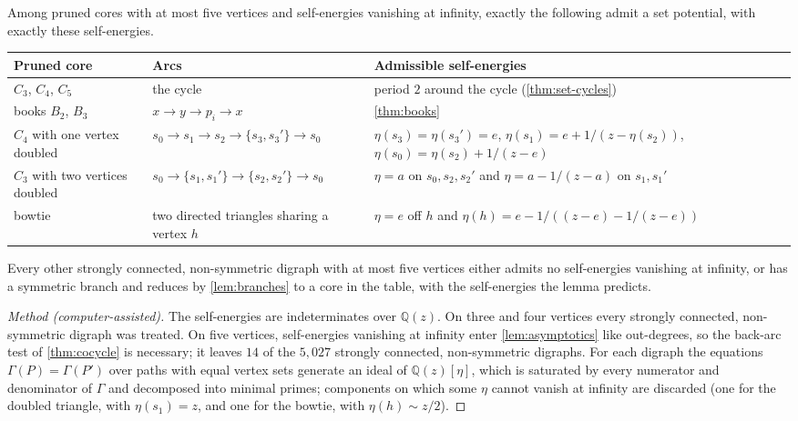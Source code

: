 \documentclass[final]{siamart0516}
\numberwithin{theorem}{section}
\numberwithin{equation}{section}
\theoremstyle{siamnonum}
\theoremstyle{plain}
\newcommand{\QQ}{\mathbb{Q}}
\newcommand{\Qz}{\QQ(z)}
\begin{document}
\begin{theorem}\label{thm:cores5}
Among pruned cores with at most five vertices and self-energies vanishing at infinity, exactly the following admit a set potential, with exactly these self-energies.
\begin{center}\small
\begin{tabularx}{\linewidth}{@{}L{0.2}L{0.3}>{\raggedright\arraybackslash}X@{}}
\toprule
Pruned core & Arcs & Admissible self-energies\\ \midrule
$C_3$, $C_4$, $C_5$ & the cycle & period $2$ around the cycle (\cref{thm:set-cycles})\\
books $B_2$, $B_3$ & $x\to y\to p_i\to x$ & \cref{thm:books}\\
$C_4$ with one vertex doubled & $s_0\to s_1\to s_2\to\{s_3,s_3'\}\to s_0$ & $\eta(s_3)=\eta(s_3')=e$, $\eta(s_1)=e+1/(z-\eta(s_2))$, $\eta(s_0)=\eta(s_2)+1/(z-e)$\\
$C_3$ with two vertices doubled & $s_0\to\{s_1,s_1'\}\to\{s_2,s_2'\}\to s_0$ & $\eta=a$ on $s_0,s_2,s_2'$ and $\eta=a-1/(z-a)$ on $s_1,s_1'$\\
bowtie & two directed triangles sharing a vertex $h$ & $\eta=e$ off $h$ and $\eta(h)=e-1/((z-e)-1/(z-e))$\\
\bottomrule
\end{tabularx}
\end{center}
Every other strongly connected, non-symmetric digraph with at most five vertices either admits no self-energies vanishing at infinity, or has a symmetric branch and reduces by \cref{lem:branches} to a core in the table, with the self-energies the lemma predicts.
\end{theorem}
\begin{proof}[Method \textup{(computer-assisted)}]
The self-energies are indeterminates over $\Qz$. On three and four vertices every strongly connected, non-symmetric digraph was treated. On five vertices, self-energies vanishing at infinity enter \cref{lem:asymptotics} like out-degrees, so the back-arc test of \cref{thm:cocycle} is necessary; it leaves $14$ of the $5{,}027$ strongly connected, non-symmetric digraphs. For each digraph the equations $\Gamma(P)=\Gamma(P')$ over paths with equal vertex sets generate an ideal of $\Qz[\eta]$, which is saturated by every numerator and denominator of $\Gamma$ and decomposed into minimal primes; components on which some $\eta$ cannot vanish at infinity are discarded (one for the doubled triangle, with $\eta(s_1)=z$, and one for the bowtie, with $\eta(h)\sim z/2$).
\end{proof}
\end{document}

